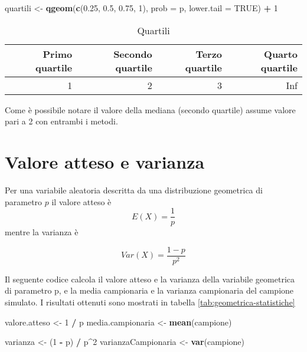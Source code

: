\documentclass[]{book}
\newenvironment{Shaded}{\begin{snugshade}}{\end{snugshade}}
\newcommand{\KeywordTok}[1]{\textcolor[rgb]{0.13,0.29,0.53}{\textbf{#1}}}
\newcommand{\DataTypeTok}[1]{\textcolor[rgb]{0.13,0.29,0.53}{#1}}
\newcommand{\DecValTok}[1]{\textcolor[rgb]{0.00,0.00,0.81}{#1}}
\newcommand{\FloatTok}[1]{\textcolor[rgb]{0.00,0.00,0.81}{#1}}
\newcommand{\StringTok}[1]{\textcolor[rgb]{0.31,0.60,0.02}{#1}}
\newcommand{\OtherTok}[1]{\textcolor[rgb]{0.56,0.35,0.01}{#1}}
\newcommand{\OperatorTok}[1]{\textcolor[rgb]{0.81,0.36,0.00}{\textbf{#1}}}
\newcommand{\NormalTok}[1]{#1}
\begin{document}
\begin{Shaded}
\begin{Highlighting}[]
\NormalTok{quartili <-}\StringTok{ }\KeywordTok{qgeom}\NormalTok{(}\KeywordTok{c}\NormalTok{(}\FloatTok{0.25}\NormalTok{, }\FloatTok{0.5}\NormalTok{, }\FloatTok{0.75}\NormalTok{, }\DecValTok{1}\NormalTok{), }\DataTypeTok{prob =}\NormalTok{ p, }\DataTypeTok{lower.tail =} \OtherTok{TRUE}\NormalTok{) }\OperatorTok{+}\StringTok{ }\DecValTok{1}
\end{Highlighting}
\end{Shaded}

\begin{table}

\caption{\label{tab:geometrica-quartili}Quartili}
\centering
\begin{tabular}[t]{r|r|r|r}
\hline
Primo quartile & Secondo quartile & Terzo quartile & Quarto quartile\\
\hline
1 & 2 & 3 & Inf\\
\hline
\end{tabular}
\end{table}

Come è possibile notare il valore della mediana (secondo quartile)
assume valore pari a 2 con entrambi i metodi.

\section{Valore atteso e varianza}\label{valore-atteso-e-varianza}

Per una variabile aleatoria descritta da una distribuzione geometrica di
parametro \(p\) il valore atteso è \[E(X) = \frac{1}{p}\] mentre la
varianza è

\[Var(X) = \frac{1 - p}{p^2}\]

Il seguente codice calcola il valore atteso e la varianza della
variabile geometrica di parametro p, e la media campionaria e la
varianza campionaria del campione simulato. I risultati ottenuti sono
mostrati in tabella \ref{tab:geometrica-statistiche}

\begin{Shaded}
\begin{Highlighting}[]
\NormalTok{valore.atteso <-}\StringTok{ }\DecValTok{1} \OperatorTok{/}\StringTok{ }\NormalTok{p}
\NormalTok{media.campionaria <-}\StringTok{ }\KeywordTok{mean}\NormalTok{(campione)}

\NormalTok{varianza <-}\StringTok{ }\NormalTok{(}\DecValTok{1} \OperatorTok{-}\StringTok{ }\NormalTok{p) }\OperatorTok{/}\StringTok{ }\NormalTok{p}\OperatorTok{^}\DecValTok{2}
\NormalTok{varianzaCampionaria <-}\StringTok{ }\KeywordTok{var}\NormalTok{(campione)}
\end{Highlighting}
\end{Shaded}
\end{document}
